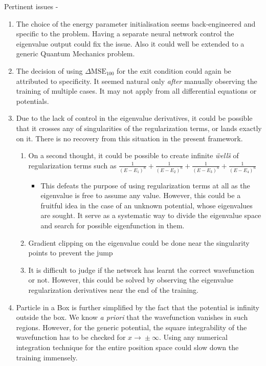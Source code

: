 \documentclass{article}
\newcommand{\dmse}{$\displaystyle{\Delta \text{MSE}_{100}}$ }
\begin{document}
\justify
Pertinent issues -
\begin{enumerate}
    \item The choice of the energy parameter initialisation seems back-engineered and specific to the problem. Having a separate neural network control the eigenvalue output could fix the issue. Also it could well be extended to a generic Quantum Mechanics problem.

    \item The decision of using \dmse for the exit condition could again be attributed to specificity. It seemed natural only \textit{after} manually observing the training of multiple cases. It may not apply from all differential equations or potentials.
    
    \item Due to the lack of control in the eigenvalue derivatives, it could be possible that it crosses any of singularities of the regularization terms, or lands exactly on it. There is no recovery from this situation in the present framework.
        \begin{enumerate}
            \item On a second thought, it could be possible to create infinite \textit{\"wells\"} of regularization terms such as $\displaystyle{\frac{1}{(E-E_1)^n} + \frac{1}{(E-E_2)^n} + \frac{1}{(E-E_3)^n} + \frac{1}{(E-E_4)^n}}$ \\
            
            \begin{itemize}
                \item This defeats the purpose of using regularization terms at all as the eigenvalue is free to assume any value. However, this could be a fruitful idea in the case of an unknown potential, whose eigenvalues are sought. It serve as a systematic way to divide the eigenvalue space and search for possible eigenfunction in them.
            \end{itemize}
            \item Gradient clipping on the eigenvalue could be done near the singularity points to prevent the jump
             \item It is difficult to judge if the network has learnt the correct wavefunction or not. However, this could be solved by observing the eigenvalue regularization derivatives near the end of the training.
        \end{enumerate}
        
    \item Particle in a Box is further simplified by the fact that the potential is infinity outside the box. We know \textit{a priori} that the wavefunction vanishes in such regions. However, for the generic potential, the square integrability of the wavefunction has to be checked for $x \xrightarrow{} \pm \infty$. Using any numerical integration technique for the entire position space could slow down the training immensely.
\end{enumerate}
\end{document}
